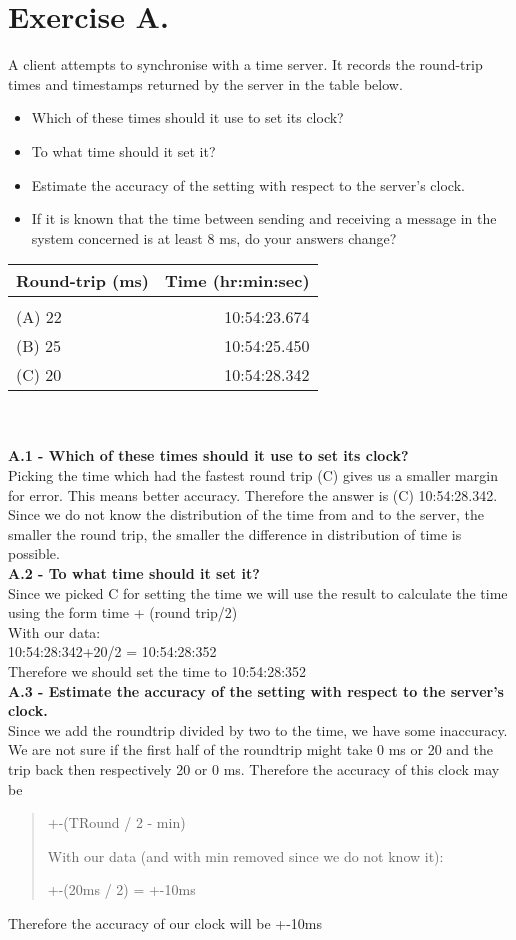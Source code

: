 \section{Exercise A.}
A client attempts to synchronise with a time server. It records the round-trip times and timestamps returned by the server in the table below.\\
\begin{itemize}
\item Which of these times should it use to set its clock? 
\item To what time should it set it? 
\item Estimate the accuracy of the setting with respect to the server’s clock. 
\item If it is known that the time between sending and receiving a message in the system concerned is at least 8 ms, do your answers change?
\end{itemize}
\begin{tabular}{ l | r }
Round-trip (ms) & Time (hr:min:sec) \\[0.1cm]
\hline \\
(A) 22 & 10:54:23.674 \\[0.1cm]
(B) 25 & 10:54:25.450 \\[0.1cm]
(C) 20 & 10:54:28.342 \\[0.1cm]
\hline 
\end{tabular}\\\\

\textbf{A.1 - Which of these times should it use to set its clock?}\\
Picking the time which had the fastest round trip (C) gives us a smaller margin for error. This means better accuracy. Therefore the answer is (C) 10:54:28.342. Since we do not know the distribution of the time from and to the server, the smaller the round trip, the smaller the difference in distribution of time is possible.\\

\textbf{A.2 - To what time should it set it?}\\
Since we picked C for setting the time we will use the result to calculate the time using the form
time + (round trip/2)\\
With our data:\\
10:54:28:342+20/2 = 10:54:28:352\\
Therefore we should set the time to 10:54:28:352\\

\textbf{A.3 - Estimate the accuracy of the setting with respect to the server’s clock.}\\
Since we add the roundtrip divided by two to the time, we have some inaccuracy. We are not sure if the first half of the roundtrip might take 0 ms or 20 and the trip back then respectively 20 or 0 ms. Therefore the accuracy of this clock may be 
\begin{quote}
+-(TRound / 2 - min)

With our data (and with min removed since we do not know it):

+-(20ms / 2) = +-10ms
\end{quote}
Therefore the accuracy of our clock will be +-10ms\\

